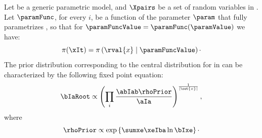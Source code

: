 \begin{theorem}
    Let \pmodel be a generic parametric model, and $\Xpairs$ be a set of random variables in \Mt.
    Let $\paramFunc$, for every $i$, be a function of the parameter $\param$ that fully parametrizes \Qvar,
    so that for $\paramFuncValue = \paramFunc(\paramValue)$ we have:
    \begin{equation}
        \pi(\xIt) = \pi \left( \rval{x} \mid \paramFuncValue \right)\cdot
        \label{eq:func_of_theta}
    \end{equation}
    The prior distribution corresponding to the central distribution for  in \Mt can be characterized
    by the following fixed point equation:
    \begin{equation}
        \bIaRoot \propto \left( \prod_i \frac{\abIab \rhoPrior}{\aIa} \right)^{\frac{1}{|\set{x}|}},
        \label{eq:fixed_point_cx}
    \end{equation}
    where
    \[
        \rhoPrior \propto \exp \left\{ \sumxe \xeIba \ln \bIxe \right\} \cdot
    \]

\end{theorem}

